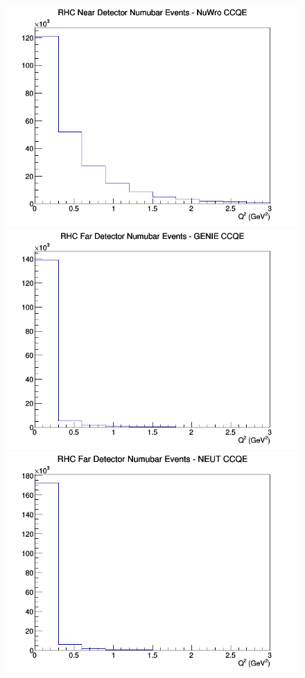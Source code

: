 \documentclass[12pt]{article}
\begin{document}
\begin{figure}[h]
\includegraphics[width=\linewidth]{eff_Q2/LAr/CCQE_RHC_ND_numubar_Q2_NuWro.png}
\endminipage
\newline
{}
\includegraphics[width=\linewidth]{eff_Q2/LAr/CCQE_RHC_FD_numubar_Q2_GENIE.png}
\endminipage
{}
\includegraphics[width=\linewidth]{eff_Q2/LAr/CCQE_RHC_FD_numubar_Q2_NEUT.png}

\end{figure}
\end{document}

